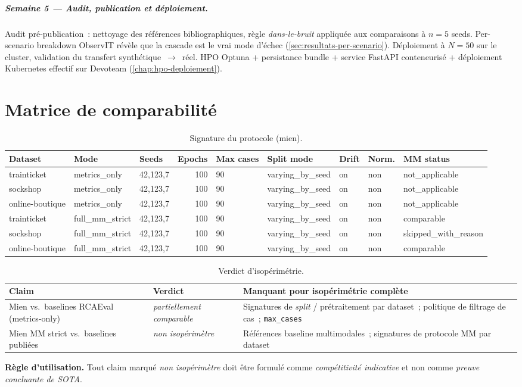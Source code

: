 \documentclass[a4paper,11pt,oneside]{report}
\begin{document}
\paragraph{Semaine 5 --- Audit, publication et d\'eploiement.}
Audit pr\'e-publication~: nettoyage des r\'ef\'erences bibliographiques, r\`egle \emph{dans-le-bruit} appliqu\'ee aux comparaisons \`a $n{=}5$ seeds. Per-scenario breakdown ObservIT r\'ev\`ele que la cascade est le vrai mode d'\'echec (\cref{sec:resultats-per-scenario}). D\'eploiement \`a $N{=}50$ sur le cluster, validation du transfert synth\'etique~$\to$~r\'eel. HPO Optuna + persistance bundle + service FastAPI conteneuris\'e + d\'eploiement Kubernetes effectif sur Devoteam (\cref{chap:hpo-deploiement}).

\chapter{Matrice de comparabilit\'e}
\label{ann:comparabilite}

\begin{table}[ht]
\centering
\caption{Signature du protocole (mien).}
\label{tab:protocol-signature}
\small
\begin{tabular}{lllrlllll}
\toprule
Dataset & Mode & Seeds & Epochs & Max cases & Split mode & Drift & Norm. & MM status \\
\midrule
trainticket & metrics\_only & 42,123,7 & 100 & 90 & varying\_by\_seed & on & non & not\_applicable \\
sockshop & metrics\_only & 42,123,7 & 100 & 90 & varying\_by\_seed & on & non & not\_applicable \\
online-boutique & metrics\_only & 42,123,7 & 100 & 90 & varying\_by\_seed & on & non & not\_applicable \\
trainticket & full\_mm\_strict & 42,123,7 & 100 & 90 & varying\_by\_seed & on & non & comparable \\
sockshop & full\_mm\_strict & 42,123,7 & 100 & 90 & varying\_by\_seed & on & non & skipped\_with\_reason \\
online-boutique & full\_mm\_strict & 42,123,7 & 100 & 90 & varying\_by\_seed & on & non & comparable \\
\bottomrule
\end{tabular}
\end{table}

\begin{table}[ht]
\centering
\caption{Verdict d'isop\'erim\'etrie.}
\label{tab:isoperimetrie}
\small
\begin{tabular}{p{}p{}p{}}
\toprule
Claim & Verdict & Manquant pour isop\'erim\'etrie compl\`ete \\
\midrule
Mien vs.\ baselines RCAEval (metrics-only) & \emph{partiellement comparable} & Signatures de \emph{split} / pr\'etraitement par dataset~; politique de filtrage de cas~; \texttt{max\_cases} \\
Mien MM strict vs.\ baselines publi\'ees & \emph{non isop\'erim\`etre} & R\'ef\'erences baseline multimodales~; signatures de protocole MM par dataset \\
\bottomrule
\end{tabular}
\end{table}

\textbf{R\`egle d'utilisation.} Tout claim marqu\'e \emph{non isop\'erim\`etre} doit \^etre formul\'e comme \emph{comp\'etitivit\'e indicative} et non comme \emph{preuve concluante de SOTA}.
\end{document}
